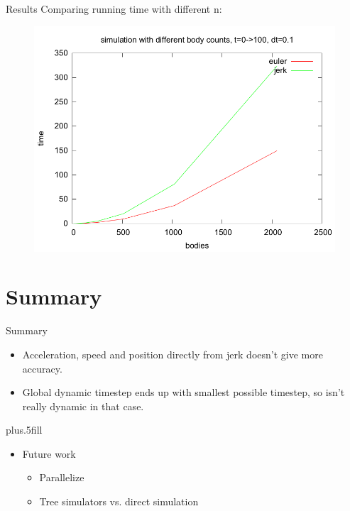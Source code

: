 \documentclass{beamer}
\begin{document}
\begin{frame}{Results}
  Comparing running time with different n:
  \begin{figure}
   \includegraphics[width=0.6\paperwidth]{../results/time_bodies.png}
\end{figure}
\end{frame}

\section*{Summary}

\begin{frame}{Summary}

  \begin{itemize}
  \item
    Acceleration, speed and position directly from jerk doesn't give more accuracy.
\item
    Global dynamic timestep ends up with smallest possible timestep, so isn't really dynamic in that case.
  \end{itemize}
  
  \vskip0pt plus.5fill
  \begin{itemize}
  \item
    Future work
    \begin{itemize}
    \item
      Parallelize 
  \item
      Tree simulators vs. direct simulation
    \end{itemize}
  \end{itemize}
\end{frame}
\end{document}
